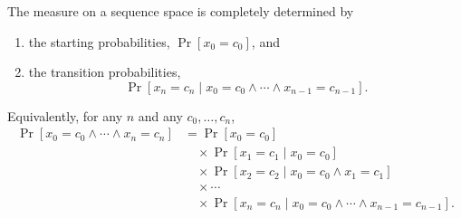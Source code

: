 The measure on a sequence space is completely determined by
\begin{enumerate}
\item[(1)] the starting probabilities, $\Pr[x_0 = c_0]$, and
\item[(2)] the transition probabilities,
$$\Pr[x_n = c_n \mid x_0 = c_0 \wedge \cdots \wedge x_{n-1} = c_{n-1}].$$
\end{enumerate}

Equivalently, for any $n$ and any $c_0, \ldots, c_n$,
\begin{align*}
\Pr[x_0 = c_0 \wedge \cdots \wedge x_n = c_n]
&= \Pr[x_0 = c_0] \\
&\quad \times \Pr[x_1 = c_1 \mid x_0 = c_0] \\
&\quad \times \Pr[x_2 = c_2 \mid x_0 = c_0 \wedge x_1 = c_1] \\
&\quad \times \cdots \\
&\quad \times \Pr[x_n = c_n \mid x_0 = c_0 \wedge \cdots \wedge x_{n-1} = c_{n-1}].
\end{align*}
